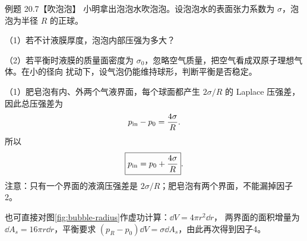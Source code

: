 \begin{origexamplebox}{例题 20.7【吹泡泡】}
小明拿出泡泡水吹泡泡。设泡泡水的表面张力系数为 $\sigma$，泡泡为半径 $R$ 的正球。

（1）若不计液膜厚度，泡泡内部压强为多大？

（2）若平衡时液膜的质量面密度为 $\sigma_0$，忽略空气质量，把空气看成双原子理想气体。在小的径向
扰动下，设气泡仍能维持球形，判断平衡是否稳定。
\end{origexamplebox}

\begin{xesolution}
（1）肥皂泡有内、外两个气液界面，每个球面都产生 $2\sigma/R$ 的 Laplace 压强差，因此总压强差为
\begin{equation*}
  p_{\rm in}-p_0=\frac{4\sigma}{R}.
\end{equation*}
所以
\begin{equation}
  \boxed{p_{\rm in}=p_0+\frac{4\sigma}{R}}.
\end{equation}
注意：只有一个界面的液滴压强差是 $2\sigma/R$；肥皂泡有两个界面，不能漏掉因子2。

\bubbleRevisionDiagram
{}\label{fig:bubble-radius}
也可直接对图\ref{fig:bubble-radius}作虚功计算：$\dd V=4\pi r^2\dd r$，
两界面的面积增量为 $\dd A_s=16\pi r\dd r$，平衡要求
$(p_R-p_0)\dd V=\sigma\dd A_s$，由此再次得到因子4。


\end{xesolution}
